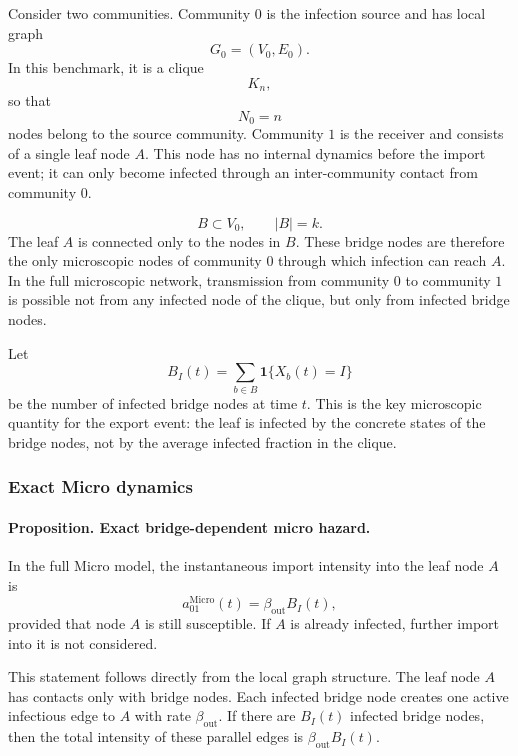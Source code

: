 \documentclass[a4paper,fleqn]{cas-sc}
\newcommand{\ReadStatusTwo}[5]{}
\begin{document}
Consider two communities. Community \(0\) is the infection source and has local graph
\[
G_0=(V_0,E_0).
\]
In this benchmark, it is a clique
\[
K_n,
\]
so that
\[
N_0=n
\]
nodes belong to the source community. Community \(1\) is the receiver and consists of a single leaf node \(A\). This node has no internal dynamics before the import event; it can only become infected through an inter-community contact from community \(0\).


\[
B\subset V_0,
\qquad |B|=k.
\]
The leaf \(A\) is connected only to the nodes in \(B\). These bridge nodes are therefore the only microscopic nodes of community \(0\) through which infection can reach \(A\). In the full microscopic network, transmission from community \(0\) to community \(1\) is possible not from any infected node of the clique, but only from infected bridge nodes.

Let
\[
B_I(t)
=
\sum_{b\in B}
\mathbf{1}\{X_b(t)=I\}
\]
be the number of infected bridge nodes at time \(t\). This is the key microscopic quantity for the export event: the leaf is infected by the concrete states of the bridge nodes, not by the average infected fraction in the clique.

\subsubsection{Exact Micro dynamics}
\ReadStatusTwo{Exact Micro dynamics}{Yulian}{1}{Michael}{0}

\paragraph{Proposition. Exact bridge-dependent micro hazard.}
In the full Micro model, the instantaneous import intensity into the leaf node \(A\) is
\[
a_{01}^{\mathrm{Micro}}(t)
=
\beta_{\mathrm{out}} B_I(t),
\]
provided that node \(A\) is still susceptible. If \(A\) is already infected, further import into it is not considered.

This statement follows directly from the local graph structure. The leaf node \(A\) has contacts only with bridge nodes. Each infected bridge node creates one active infectious edge to \(A\) with rate \(\beta_{\mathrm{out}}\). If there are \(B_I(t)\) infected bridge nodes, then the total intensity of these parallel edges is \(\beta_{\mathrm{out}}B_I(t)\).
\end{document}
